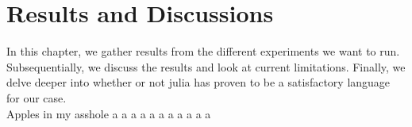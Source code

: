 \chapter{Results and Discussions}
\label{chap:results}

In this chapter, we gather results from the different experiments we want to run. Subsequentially, we discuss the results and look at current limitations. Finally, we delve deeper into whether or not \Gls{julia} has proven to be a satisfactory language for our case. \\


Apples in my asshole \cite{projthesis}
a \cite{claerbout1991scrutiny}
a \cite{landes1951scrutiny}
a \cite{omar2013machine}
a \cite{wei2022lstmautoencoder}
a \cite{julia}
a \cite{apSensing2019railwaydas}
a \cite{DBLP:journals/corr/SrivastavaMS15}
a \cite{2011ndongsigprocandet}
a \cite{doi:10.1137/141000671}
a \cite{bioengineering10040405}
a \cite{maulik2020recurrent}











